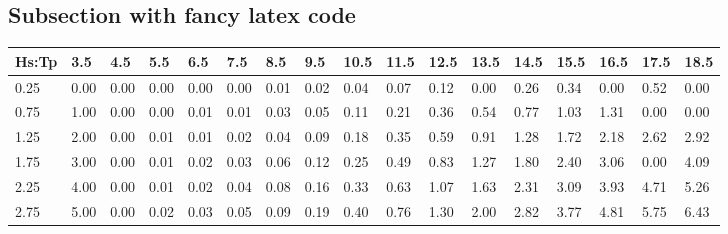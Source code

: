 \documentclass[a4paper]{article}%
\begin{document}
\subsection{Subsection with fancy latex code}%
\label{subsec:Subsectionwithfancylatexcode}%
\newpage%
\label{sec:Heavestroke3hmax}%
\begin{footnotesize}\begin{tabular}{l|llllllllllllllll}
\toprule
 Hs:Tp &    3.5 &    4.5 &    5.5 &    6.5 &    7.5 &    8.5 &    9.5 &    10.5 &    11.5 &    12.5 &    13.5 &    14.5 &    15.5 &    16.5 &    17.5 &    18.5 \\
\midrule
 0.25 & \color{white}0.00 & \color{white}0.00 & \color{green}0.00 & \color{green}0.00 & \color{green}0.00 & \color{green}0.01 & \color{green}0.02 & \color{green}0.04 & \color{green}0.07 & \color{green}0.12 & \color{white}0.00 & \color{green}0.26 & \color{green}0.34 & \color{white}0.00 & \color{green}0.52 & \color{white}0.00 \\
 0.75 & \color{green}1.00 & \color{green}0.00 & \color{green}0.00 & \color{green}0.01 & \color{green}0.01 & \color{green}0.03 & \color{green}0.05 & \color{green}0.11 & \color{green}0.21 & \color{green}0.36 & \color{green}0.54 & \color{green}0.77 & \color{yellow}1.03 & \color{yellow}1.31 & \color{white}0.00 & \color{white}0.00 \\
 1.25 & \color{yellow}2.00 & \color{green}0.00 & \color{green}0.01 & \color{green}0.01 & \color{green}0.02 & \color{green}0.04 & \color{green}0.09 & \color{green}0.18 & \color{green}0.35 & \color{green}0.59 & \color{green}0.91 & \color{yellow}1.28 & \color{yellow}1.72 & \color{yellow}2.18 & \color{yellow}2.62 & \color{yellow}2.92 \\
 1.75 & \color{yellow}3.00 & \color{green}0.00 & \color{green}0.01 & \color{green}0.02 & \color{green}0.03 & \color{green}0.06 & \color{green}0.12 & \color{green}0.25 & \color{green}0.49 & \color{green}0.83 & \color{yellow}1.27 & \color{yellow}1.80 & \color{yellow}2.40 & \color{yellow}3.06 & \color{white}0.00 & \color{yellow}4.09 \\
 2.25 & \color{yellow}4.00 & \color{green}0.00 & \color{green}0.01 & \color{green}0.02 & \color{green}0.04 & \color{green}0.08 & \color{green}0.16 & \color{green}0.33 & \color{green}0.63 & \color{yellow}1.07 & \color{yellow}1.63 & \color{yellow}2.31 & \color{yellow}3.09 & \color{yellow}3.93 & \color{red}4.71 & \color{red}5.26 \\
 2.75 & \color{red}5.00 & \color{white}0.00 & \color{green}0.02 & \color{green}0.03 & \color{green}0.05 & \color{green}0.09 & \color{green}0.19 & \color{green}0.40 & \color{green}0.76 & \color{yellow}1.30 & \color{yellow}2.00 & \color{yellow}2.82 & \color{yellow}3.77 & \color{red}4.81 & \color{red}5.75 & \color{red}6.43 \\

\end{tabular}
\end{footnotesize}
\end{document}
